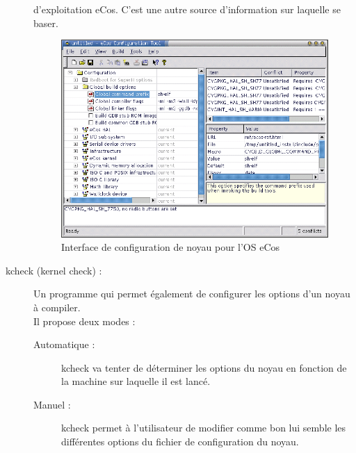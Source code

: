 \documentclass[17pts]{report}
\begin{document}
\begin{description}
        d’exploitation eCos. C’est une autre source d’information
        sur laquelle se baser. \\
        \begin{figure}[H]
            \includegraphics[scale=1.2]{illustrations/eCos_config.png}
            \centering
            \caption{Interface de configuration de noyau pour l'OS eCos}
            \label{fig:InterfaceEcos}
        \end{figure}
        \pagebreak
    \item[kcheck (kernel check) :]Un programme qui permet également de configurer les options
        d’un noyau à compiler. \\
        Il propose deux modes :
    \begin{description}
        \item[Automatique :] kcheck va tenter de déterminer les options du noyau
            en fonction de la machine sur laquelle il est lancé.
        \item[Manuel :] kcheck permet à l’utilisateur de modifier comme bon lui
            semble les différentes options du fichier de configuration du noyau.
    \end{description}
        \begin{figure}[H]

\end{figure}
\end{description}
\end{document}
